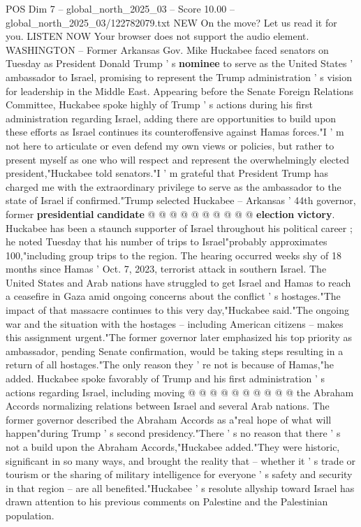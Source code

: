 \begin{textsample}{POS Dim 7 – global\_north\_2025\_03 – Score 10.00 – global\_north\_2025\_03/122782079.txt}  \label{ex:f7_pos_317}
NEW On the move?
Let us read it for you.
LISTEN NOW Your browser does not support the audio element.
WASHINGTON -- Former Arkansas Gov.
Mike Huckabee faced senators on Tuesday as President Donald Trump ' s \textbf{nominee} to serve as the United States ' ambassador to Israel, promising to represent the Trump administration ' s vision for leadership in the Middle East.
Appearing before the Senate Foreign Relations Committee, Huckabee spoke highly of Trump ' s actions during his first administration regarding Israel, adding there are opportunities to build upon these efforts as Israel continues its counteroffensive against Hamas forces."I ' m not here to articulate or even defend my own views or policies, but rather to present myself as one who will respect and represent the overwhelmingly elected president,"Huckabee told senators."I ' m grateful that President Trump has charged me with the extraordinary privilege to serve as the ambassador to the state of Israel if confirmed."Trump selected Huckabee -- Arkansas ' 44th governor, former \textbf{presidential} \textbf{candidate} @ @ @ @ @ @ @ @ @ @ \textbf{election} \textbf{victory}.
Huckabee has been a staunch supporter of Israel throughout his political career ; he noted Tuesday that his number of trips to Israel"probably approximates 100,"including group trips to the region.
The hearing occurred weeks shy of 18 months since Hamas ' Oct. 7, 2023, terrorist attack in southern Israel.
The United States and Arab nations have struggled to get Israel and Hamas to reach a ceasefire in Gaza amid ongoing concerns about the conflict ' s hostages."The impact of that massacre continues to this very day,"Huckabee said."The ongoing war and the situation with the hostages -- including American citizens -- makes this assignment urgent."The former governor later emphasized his top priority as ambassador, pending Senate confirmation, would be taking steps resulting in a return of all hostages."The only reason they ' re not is because of Hamas,"he added.
Huckabee spoke favorably of Trump and his first administration ' s actions regarding Israel, including moving @ @ @ @ @ @ @ @ @ @ the Abraham Accords normalizing relations between Israel and several Arab nations.
The former governor described the Abraham Accords as a"real hope of what will happen"during Trump ' s second presidency."There ' s no reason that there ' s not a build upon the Abraham Accords,"Huckabee added."They were historic, significant in so many ways, and brought the reality that -- whether it ' s trade or tourism or the sharing of military intelligence for everyone ' s safety and security in that region -- are all benefited."Huckabee ' s resolute allyship toward Israel has drawn attention to his previous comments on Palestine and the Palestinian population.

\end{textsample}
